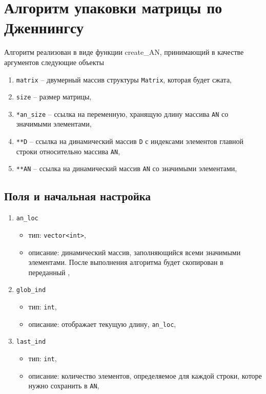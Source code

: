 \section{Алгоритм упаковки матрицы по Дженнингсу}
Алгоритм реализован в виде функции create\_AN, принимающий в качестве аргументов следующие объекты
\begin{enumerate}
	\item \texttt{matrix} -- двумерный массив структуры \texttt{Matrix}, которая будет сжата,
	
	\item \texttt{size} -- размер матрицы,
	
	\item \texttt{*an\_size} -- ссылка на переменную, хранящую длину массива \texttt{AN} со значимыми элементами,
	
	\item \texttt{**D} -- ссылка на динамический массив \texttt{D} с индексами элементов главной строки относительно массива \texttt{AN},
	
	\item \texttt{**AN} -- ссылка на динамический массив \texttt{AN} со значимыми элементами,
\end{enumerate}
\subsection*{Поля и начальная настройка}
\begin{enumerate}
	\item \texttt{an\_loc}
	\begin{itemize}
		\item тип: \texttt{vector<int>},
		\item описание: динамический массив, заполняющийся всеми значимыми элементами. После выполнения алгоритма будет скопирован в переданный ,
	\end{itemize}
	
	\item \texttt{glob\_ind}
	\begin{itemize}
		\item тип: \texttt{int},
		\item описание: отображает текущую длину, \texttt{an\_loc},
	\end{itemize}
	
	\item \texttt{last\_ind}
	\begin{itemize}
		\item тип: \texttt{int},
		\item описание: количество элементов, определяемое для каждой строки, которе нужно сохранить в \texttt{AN},
	\end{itemize}
\end{enumerate}

